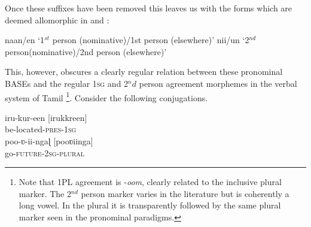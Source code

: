 \documentclass[output=paper,colorlinks,citecolor=brown,
]{langscibook}
\begin{document}
Once these suffixes have been removed this leaves us with the forms which are deemed allomorphic in \citet{Moskal2015} and \citet{moskal2016towards}:

\begin{exe}
\ex \label{new4}
\begin{xlist}
\ex \label{new4a}
naan/en	‘1$^{st}$ person (nominative)/1st person (elsewhere)’
\ex \label{new4b}
nii/un		‘2$^{nd}$ person(nominative)/2nd person (elsewhere)’
\end{xlist}
\end{exe}

This, however, obscures a clearly regular relation between these pronominal BASEs and the regular 1\textsc{sg} and 2$^nd$ person agreement morphemes in the verbal system of Tamil \footnote{  Note that 1PL agreement is -\textit{oom}, clearly related to the inclusive plural marker. The 2$^{nd}$ person marker varies in the literature but is coherently a long vowel. In the plural it is transparently followed by the same plural marker seen in the pronominal paradigms.}.  Consider the following conjugations.

\begin{exe}
\ex \label{new5}
\begin{xlist}
\ex \label{new5a}
\gll iru-kur-een	\jambox{}		[irukkreen] \\ 
be-located-\textsc{pres}-1\textsc{sg} \\
\ex \label{new5b}
poo-ʋ-ii-ngaɭ	\jambox{}	[pooʋiinga] \\
go-\textsc{future}-2\textsc{sg}-\textsc{plural} \\
\end{xlist}
\end{exe}
\end{document}

